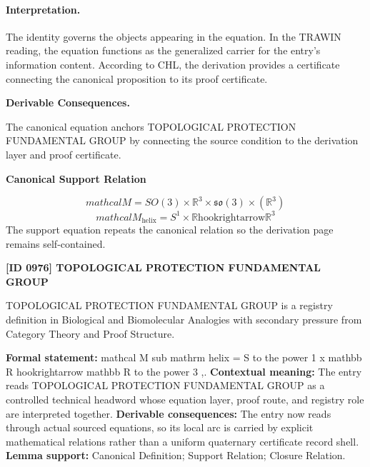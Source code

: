 \paragraph{Interpretation.}
The identity governs the objects appearing in the equation. In the TRAWIN reading, the equation functions as the generalized carrier for the entry’s information content. According to CHL, the derivation provides a certificate connecting the canonical proposition to its proof certificate.

\par\vspace{0.35em}
\noindent\textbf{Derivable Consequences.}\quad
\begingroup
\footnotesize
\raggedright
The canonical equation anchors TOPOLOGICAL PROTECTION FUNDAMENTAL GROUP by connecting the source condition to the derivation layer and proof certificate.
\par\endgroup

\noindent\textbf{Canonical Support Relation}\par
\[
mathcal{M}=SO(3)\times\mathbb{R}^{3}\times\mathfrak{so}(3)^{ }\times(\mathbb{R}^{3})^{ }
\]
\[
mathcal{M}_{\mathrm{helix}} = S^{1} \times \mathbb{R} \mathrm{hookrightarrow} \mathbb{R}^{3}
\]
\noindent The support equation repeats the canonical relation so the derivation page remains self-contained.\par

\clearpage
\noindent\textbf{[ID 0976] TOPOLOGICAL PROTECTION FUNDAMENTAL GROUP}\par
\vspace{0.35em}
\begingroup\small
{}
TOPOLOGICAL PROTECTION FUNDAMENTAL GROUP is a registry definition in Biological and Biomolecular Analogies with secondary pressure from Category Theory and Proof Structure.

\begingroup\footnotesize\setlength{\emergencystretch}{3em}\sloppy
\textbf{Formal statement:} mathcal M sub mathrm helix = S to the power 1 x mathbb R hookrightarrow mathbb R to the power 3 ,. \textbf{Contextual meaning:} The entry reads TOPOLOGICAL PROTECTION FUNDAMENTAL GROUP as a controlled technical headword whose equation layer, proof route, and registry role are interpreted together. \textbf{Derivable consequences:} The entry now reads through actual sourced equations, so its local arc is carried by explicit mathematical relations rather than a uniform quaternary certificate record shell. \textbf{Lemma support:} Canonical Definition; Support Relation; Closure Relation.\par
\endgroup


